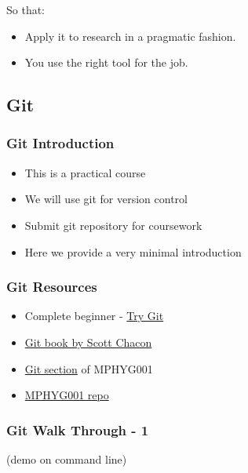 So that:

\begin{itemize}
\itemsep1pt\parskip0pt
\item
  Apply it to research in a pragmatic fashion.
\item
  You use the right tool for the job.
\end{itemize}

\subsection{Git}\label{git}

\subsubsection{Git Introduction}\label{git-introduction}

\begin{itemize}
\itemsep1pt\parskip0pt
\item
  This is a practical course
\item
  We will use git for version control
\item
  Submit git repository for coursework
\item
  Here we provide a very minimal introduction
\end{itemize}

\subsubsection{Git Resources}\label{git-resources}

\begin{itemize}
\itemsep1pt\parskip0pt
\item
  Complete beginner - \href{https://try.github.io}{Try Git}
\item
  \href{https://git-scm.com/book/en/v2}{Git book by Scott Chacon}
\item
  \href{http://github-pages.ucl.ac.uk/rsd-engineeringcourse/ch02git/}{Git
  section} of MPHYG001
\item
  \href{https://github.com/UCL/rsd-engineeringcourse}{MPHYG001 repo}
\end{itemize}

\subsubsection{Git Walk Through - 1}\label{git-walk-through---1}

(demo on command line)

